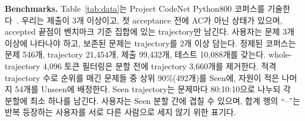 \documentclass[10pt,conference]{IEEEtran}
\begin{document}
\noindent\textbf{Benchmarks.} Table~\ref{tab:data}는 Project CodeNet Python800 코퍼스를 기술한다~\cite{puri2021project}. 우리는 제출이 3개 이상이고, 첫 acceptance 전에 AC가 아닌 상태가 있으며, accepted 끝점이 벤치마크 기준 집합에 있는 trajectory만 남긴다. 사용자는 문제 3개 이상에 나타나야 하고, 보존된 문제는 trajectory를 2개 이상 담는다. 정제된 코퍼스는 문제 546개, trajectory 21,454개, 제출 99,432개, 테스트 10,088개를 갖는다. whole-trajectory 4,096 토큰 필터링은 분할 전에 trajectory 3,660개를 제거한다. 적격 trajectory 수로 순위를 매긴 문제들 중 상위 90\%(492개)를 Seen에, 자원이 적은 나머지 54개를 Unseen에 배정한다. Seen trajectory는 문제마다 80:10:10으로 나누되 각 분할에 최소 하나를 남긴다. 사용자는 Seen 분할 간에 겹칠 수 있으며, 합계 행의 ``--''는 반복 등장하는 사용자를 서로 다른 사람으로 세지 않기 위한 표기다.
\end{document}
